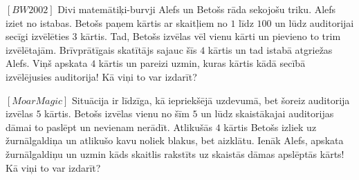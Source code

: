 \begin{problem}
$[BW2002]$
Divi matemātiķi-burvji Alefs un Betošs rāda sekojošu triku. Alefs iziet no istabas. Betošs paņem kārtis ar skaitļiem no $1$ līdz $100$ un lūdz auditorijai secīgi izvēlēties $3$ kārtis. Tad, Betošs izvēlas vēl vienu kārti un pievieno to trim izvēlētajām. Brīvprātīgais skatītājs sajauc šīs $4$ kārtis un tad istabā atgriežas Alefs. Viņš apskata $4$ kārtis un pareizi uzmin, kuras kārtis kādā secībā izvēlējusies auditorija! Kā viņi to var izdarīt?
\end{problem}

\begin{problem}
$[MoarMagic]$
Situācija ir līdzīga, kā iepriekšējā uzdevumā, bet šoreiz auditorija izvēlas $5$ kārtis. Betošs izvēlas vienu no šīm $5$ un lūdz skaistākajai auditorijas dāmai to paslēpt un nevienam nerādīt. Atlikušās $4$ kārtis Betošs izliek uz žurnālgaldiņa un atlikušo kavu noliek blakus, bet aizklātu. Ienāk Alefs, apskata žurnālgaldiņu un uzmin kāds skaitlis rakstīts uz skaistās dāmas apslēptās kārts! Kā viņi to var izdarīt?
\end{problem}



